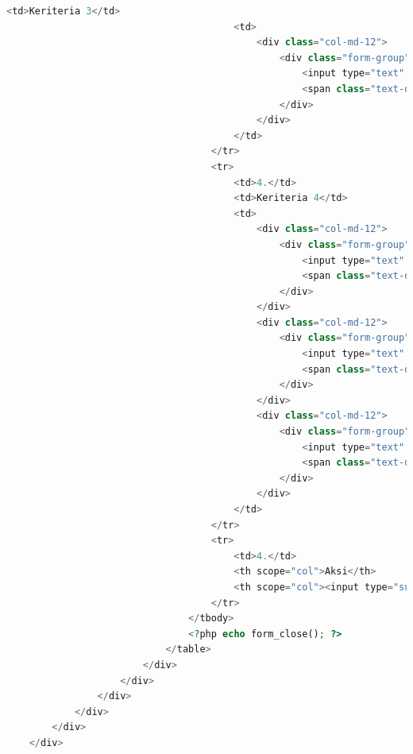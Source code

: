 \begin{lstlisting}[language=PHP]
	                                    <td>Keriteria 3</td>  
	                                    <td>  
	                                        <div class="col-md-12">  
	                                            <div class="form-group">  
	                                                <input type="text" name="bobot_keriteria3" value="<?= $c3 ?>" class="form-control" id="bobot_keriteria3" readonly />  
	                                                <span class="text-danger"><?php echo form_error('bobot_keriteria3'); ?></span>  
	                                            </div>  
	                                        </div>  
	                                    </td>  
	                                </tr>  
	                                <tr>  
	                                    <td>4.</td>  
	                                    <td>Keriteria 4</td>  
	                                    <td>  
	                                        <div class="col-md-12">  
	                                            <div class="form-group">  
	                                                <input type="text" name="bobot_keriteria4" value="<?= $c4 ?>" class="form-control" id="bobot_keriteria4" readonly />  
	                                                <span class="text-danger"><?php echo form_error('bobot_keriteria4'); ?></span>  
	                                            </div>  
	                                        </div>  
	                                        <div class="col-md-12">  
	                                            <div class="form-group">  
	                                                <input type="text" name="id_user" value="<?= $id_user ?>" class="form-control" id="id_user" hidden />  
	                                                <span class="text-danger"><?php echo form_error('id_user'); ?></span>  
	                                            </div>  
	                                        </div>  
	                                        <div class="col-md-12">  
	                                            <div class="form-group">  
	                                                <input type="text" name="tipe" value="<?= $tipe ?>" class="form-control" id="tipe" hidden />  
	                                                <span class="text-danger"><?php echo form_error('tipe'); ?></span>  
	                                            </div>  
	                                        </div>  
	                                    </td>  
	                                </tr>  
	                                <tr>  
	                                    <td>4.</td>  
	                                    <th scope="col">Aksi</th>  
	                                    <th scope="col"><input type="submit" name="submit" value="Simpan Data Entropy" class="btn btn-success"></th>  
	                                </tr>  
	                            </tbody>  
	                            <?php echo form_close(); ?>  
	                        </table>  
	                    </div>  
	                </div>  
	            </div>  
	        </div>  
	    </div>  
	</div>  
\end{lstlisting}

